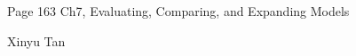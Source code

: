 \documentclass{article}
\begin{document}
\large %


{\Large Page 163 %
\hfill  Ch7, Evaluating, Comparing, and Expanding Models}

\begin{center}
{\Large Xinyu Tan} 
\end{center}
\vspace{0.05in}

 \renewcommand{\labelitemi}{$\textendash$}
\end{document}
